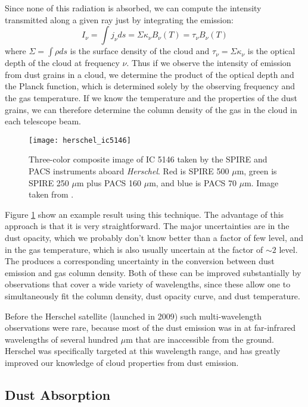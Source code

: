 Since none of this radiation is absorbed, we can compute the intensity transmitted along a given ray just by integrating the emission: 
  \begin{equation}
  I_{\nu} = \int j_{\nu} ds = \Sigma \kappa_{\nu} B_{\nu}(T) = \tau_{\nu} B_{\nu}(T)
  \end{equation}
where $\Sigma=\int \rho ds$ is the surface density of the cloud and $\tau_{\nu} = \Sigma \kappa_{\nu}$ is the optical depth of the cloud at frequency $\nu$. Thus if we observe the intensity of emission from dust grains in a cloud, we determine the product of the optical depth and the Planck function, which is determined solely by the observing frequency and the gas temperature. If we know the temperature and the properties of the dust grains, we can therefore determine the column density of the gas in the cloud in each telescope beam.

\begin{figure}
\texttt{[image: herschel\_ic5146]}
\caption[\textit{Herschel} map of IC 5146]{
\label{fig:herschel_ic5146}
Three-color composite image of IC 5146 taken by the SPIRE and PACS instruments aboard \textit{Herschel}. Red is SPIRE 500 $\mu$m, green is SPIRE 250 $\mu$m plus PACS 160 $\mu$m, and blue is PACS 70 $\mu$m. Image taken from \citet{arzoumanian11a}.
}
\end{figure}

Figure \ref{fig:herschel_ic5146} show an example result using this technique. The advantage of this approach is that it is very straightforward. The major uncertainties are in the dust opacity, which we probably don't know better than a factor of few level, and in the gas temperature, which is also usually uncertain at the factor of $\sim 2$ level. The produces a corresponding uncertainty in the conversion between dust emission and gas column density. Both of these can be improved substantially by observations that cover a wide variety of wavelengths, since these allow one to simultaneously fit the column density, dust opacity curve, and dust temperature.

Before the Herschel satellite (launched in 2009) such multi-wavelength observations were rare, because most of the dust emission was in at far-infrared wavelengths of several hundred $\mu$m that are inaccessible from the ground. Herschel was specifically targeted at this wavelength range, and has greatly improved our knowledge of cloud properties from dust emission.

\subsection{Dust Absorption}

